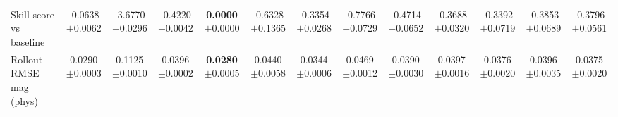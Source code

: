 \begin{table}[t]
{\begin{tabular}{lcccccccccccc}
Skill score vs baseline & \makecell{-0.0638\\[-2pt]{\scriptsize$\pm$0.0062}} & \makecell{-3.6770\\[-2pt]{\scriptsize$\pm$0.0296}} & \makecell{-0.4220\\[-2pt]{\scriptsize$\pm$0.0042}} & \makecell{\textbf{0.0000}\\[-2pt]{\scriptsize$\pm$0.0000}} & \makecell{-0.6328\\[-2pt]{\scriptsize$\pm$0.1365}} & \makecell{-0.3354\\[-2pt]{\scriptsize$\pm$0.0268}} & \makecell{-0.7766\\[-2pt]{\scriptsize$\pm$0.0729}} & \makecell{-0.4714\\[-2pt]{\scriptsize$\pm$0.0652}} & \makecell{-0.3688\\[-2pt]{\scriptsize$\pm$0.0320}} & \makecell{-0.3392\\[-2pt]{\scriptsize$\pm$0.0719}} & \makecell{-0.3853\\[-2pt]{\scriptsize$\pm$0.0689}} & \makecell{-0.3796\\[-2pt]{\scriptsize$\pm$0.0561}} \\
Rollout RMSE mag (phys) & \makecell{0.0290\\[-2pt]{\scriptsize$\pm$0.0003}} & \makecell{0.1125\\[-2pt]{\scriptsize$\pm$0.0010}} & \makecell{0.0396\\[-2pt]{\scriptsize$\pm$0.0002}} & \makecell{\textbf{0.0280}\\[-2pt]{\scriptsize$\pm$0.0005}} & \makecell{0.0440\\[-2pt]{\scriptsize$\pm$0.0058}} & \makecell{0.0344\\[-2pt]{\scriptsize$\pm$0.0006}} & \makecell{0.0469\\[-2pt]{\scriptsize$\pm$0.0012}} & \makecell{0.0390\\[-2pt]{\scriptsize$\pm$0.0030}} & \makecell{0.0397\\[-2pt]{\scriptsize$\pm$0.0016}} & \makecell{0.0376\\[-2pt]{\scriptsize$\pm$0.0020}} & \makecell{0.0396\\[-2pt]{\scriptsize$\pm$0.0035}} & \makecell{0.0375\\[-2pt]{\scriptsize$\pm$0.0020}} \\

\end{tabular}}
\end{table}
